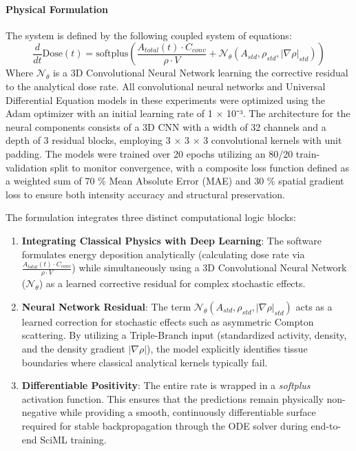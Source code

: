 \documentclass[a4paper,10pt,preprint]{elsarticle}
\begin{document}
\paragraph{Physical Formulation}
The system is defined by the following coupled system of equations:
\begin{equation}
    \frac{d}{dt} \text{Dose}(t) = \text{softplus} \left( \frac{A_{total}(t) \cdot C_{conv}}{\rho \cdot V} + \mathcal{N}_\theta(A_{std}, \rho_{std}, |\nabla \rho|_{std}) \right)
\end{equation}
Where $\mathcal{N}_\theta$ is a 3D Convolutional Neural Network learning the corrective residual to the analytical dose rate. All convolutional neural networks and Universal Differential Equation models in these experiments were optimized using the Adam optimizer with an initial learning rate of 1
  × 10⁻³. The architecture for the neural components consists of a 3D CNN with a width of 32 channels and a depth of 3 residual blocks, employing 3 × 3 × 3 convolutional kernels
  with unit padding. The models were trained over 20 epochs utilizing an 80/20 train-validation split to monitor convergence, with a composite loss function defined as a
  weighted sum of 70 \% Mean Absolute Error (MAE) and 30 \% spatial gradient loss to ensure both intensity accuracy and structural preservation.

The formulation integrates three distinct computational logic blocks:
\begin{enumerate}
    \item \textbf{Integrating Classical Physics with Deep Learning}: The software formulates energy deposition analytically (calculating dose rate via $\frac{A_{total}(t) \cdot C_{conv}}{\rho \cdot V}$) while simultaneously using a 3D Convolutional Neural Network ($\mathcal{N}_\theta$) as a learned corrective residual for complex stochastic effects.
    \item \textbf{Neural Network Residual}: The term $\mathcal{N}_\theta(A_{std}, \rho_{std}, |\nabla \rho|_{std})$ acts as a learned correction for stochastic effects such as asymmetric Compton scattering. By utilizing a Triple-Branch input (standardized activity, density, and the density gradient $|\nabla \rho|$), the model explicitly identifies tissue boundaries where classical analytical kernels typically fail.
    \item \textbf{Differentiable Positivity}: The entire rate is wrapped in a \textit{softplus} activation function. This ensures that the predictions remain physically non-negative while providing a smooth, continuously differentiable surface required for stable backpropagation through the ODE solver during end-to-end SciML training.
\end{enumerate}
\end{document}
